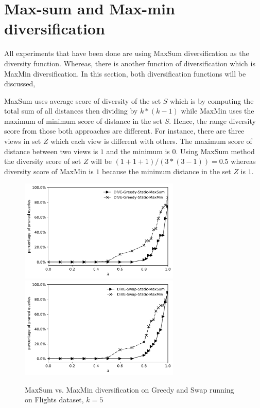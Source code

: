 \documentclass{article}
\begin{document}
\section{Max-sum and Max-min diversification}
All experiments that have been done are using MaxSum diversification as the diversity function. Whereas, there is another function of diversification which is MaxMin diversification. In this section, both diversification functions will be discussed, 

MaxSum uses average score of diversity of the set $ S $ which is by computing the total sum of all distances then dividing by $ k*(k-1) $ while MaxMin uses the maximum of minimum score of distance in the set $ S $.  Hence, the range diversity score from those both approaches are different. For instance, there are three views in set $ Z $ which each view is different with others. The maximum score of distance between two views is $ 1 $ and the minimum is $ 0 $. Using MaxSum method the diversity score of set $ Z $ will be $ (1+1+1)/(3*(3-1)) = 0.5 $ whereas diversity score of MaxMin is $ 1 $ because the minimum distance in the set $ Z $ is $ 1 $. 


\begin{figure}
	\begin{center}
		\includegraphics[width=3.0in]{figures/MaxSum_MaxMin_Greedy}
		\includegraphics[width=3.0in]{figures/MaxSum_MaxMin_Swap}
		\caption{MaxSum vs. MaxMin diversification on Greedy and Swap running on Flights dataset, $k = 5$}
		\label{fig:maxsum-maxmin-greedy-swap}
	\end{center}
\end{figure}
\end{document}
